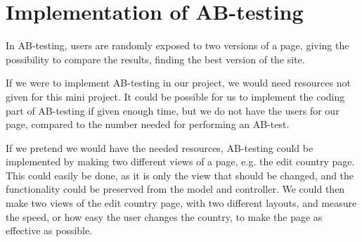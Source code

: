 \section{Implementation of AB-testing}
In AB-testing, users are randomly exposed to two versions of a page, giving the possibility to compare the results, finding the best version of the site.

If we were to implement AB-testing in our project, we would need resources not given for this mini project. It could be possible for us to implement the coding part of AB-testing if given enough time, but we do not have the users for our page, compared to the number needed for performing an AB-test. 

If we pretend we would have the needed resources, AB-testing could be implemented by making two different views of a page, e.g. the edit country page. This could easily be done, as it is only the view that should be changed, and the functionality could be preserved from the model and controller. We could then make two views of the edit country page, with two different layouts, and measure the speed, or how easy the user changes the country, to make the page as effective as possible.